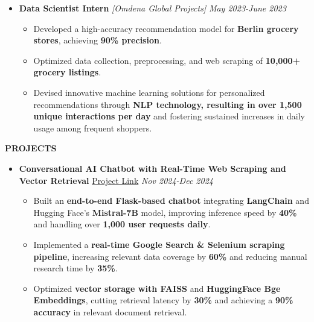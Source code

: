 \documentclass[a4paper,10pt]{article}
\newcommand{\resheading}[1]{%
  \par\noindent%
  \small%
  \colorbox{mygrey}{%
    \parbox{\dimexpr\linewidth-2\fboxsep\relax}{%
      \textbf{#1}%
    }%
  }%
  \par\nobreak%
}
\begin{document}
\begin{itemize}

\vspace{-0.5mm}
\item {\bf Data Scientist Intern } \textit{[Omdena Global Projects]}
\textit{\hfill 
{May 2023-June 2023}
}
\vspace{-1mm}

\begin{itemize}

\item Developed a high-accuracy recommendation model for \textbf{Berlin grocery stores}, achieving \textbf{90\% precision}.

\item Optimized data collection, preprocessing, and web scraping of \textbf{10,000+ grocery listings}.

\item Devised innovative machine learning solutions for personalized recommendations through \textbf{NLP technology, resulting in over 1,500 unique interactions per day} and fostering sustained increases in daily usage among frequent shoppers.

\vspace{-1mm}

\end{itemize}
\end{itemize}



\resheading{\textbf{PROJECTS} }

\begin{itemize}

\vspace{-0.5mm}
\item {\bf Conversational AI Chatbot with Real-Time Web Scraping and Vector Retrieval}  
\href{https://github.com/kaushik1064/Conversational-AI-Chatbot}{Project Link}  
\textit{\hfill {Nov 2024-Dec 2024}}

\begin{itemize}

\vspace{-2mm}
\item Built an \textbf{end-to-end Flask-based chatbot} integrating \textbf{LangChain} and Hugging Face’s \textbf{Mistral-7B} model, improving inference speed by \textbf{40\%} and handling over \textbf{1,000 user requests daily}.  
\item Implemented a \textbf{real-time Google Search \& Selenium scraping pipeline}, increasing relevant data coverage by \textbf{60\%} and reducing manual research time by \textbf{35\%}.  
\item Optimized \textbf{vector storage with FAISS} and \textbf{HuggingFace Bge Embeddings}, cutting retrieval latency by \textbf{30\%} and achieving a \textbf{90\% accuracy} in relevant document retrieval.  

\vspace{-2mm}
\end{itemize}
\end{itemize}
\end{document}
